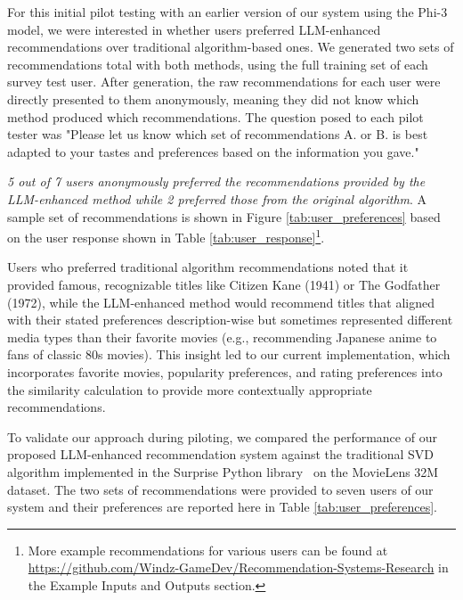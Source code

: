 \documentclass[sigconf]{acmart}
\begin{document}
For this initial pilot testing with an earlier version of our system using the Phi-3 model, we were interested in whether users preferred LLM-enhanced recommendations over traditional algorithm-based ones. We generated two sets of recommendations total with both methods, using the full training set of each survey test user. After generation, the raw recommendations for each user were directly presented to them anonymously, meaning they did not know which method produced which recommendations. The question posed to each pilot tester was "Please let us know which set of recommendations A. or B. is best adapted to your tastes and preferences based on the information you gave."

\emph{5 out of 7 users anonymously preferred the recommendations provided by the LLM-enhanced method while 2 preferred those from the original algorithm}. A sample set of recommendations is shown in Figure \ref{tab:user_preferences} based on the user response shown in Table \ref{tab:user_response}\footnote{More example recommendations for various users can be found at \url{https://github.com/Windz-GameDev/Recommendation-Systems-Research} in the Example Inputs and Outputs section.}.

Users who preferred traditional algorithm recommendations noted that it provided famous, recognizable titles like Citizen Kane (1941) or The Godfather (1972), while the LLM-enhanced method would recommend titles that aligned with their stated preferences description-wise but sometimes represented different media types than their favorite movies (e.g., recommending Japanese anime to fans of classic 80s movies). This insight led to our current implementation, which incorporates favorite movies, popularity preferences, and rating preferences into the similarity calculation to provide more contextually appropriate recommendations.

To validate our approach during piloting, we compared the performance of our proposed LLM-enhanced recommendation system against the traditional SVD algorithm implemented in the Surprise Python library~\cite{hug2020surprise} on the MovieLens 32M dataset. \cite{harper2015movielens} The two sets of recommendations were provided to seven users of our system and their preferences are reported here in Table \ref{tab:user_preferences}.

\end{document}
